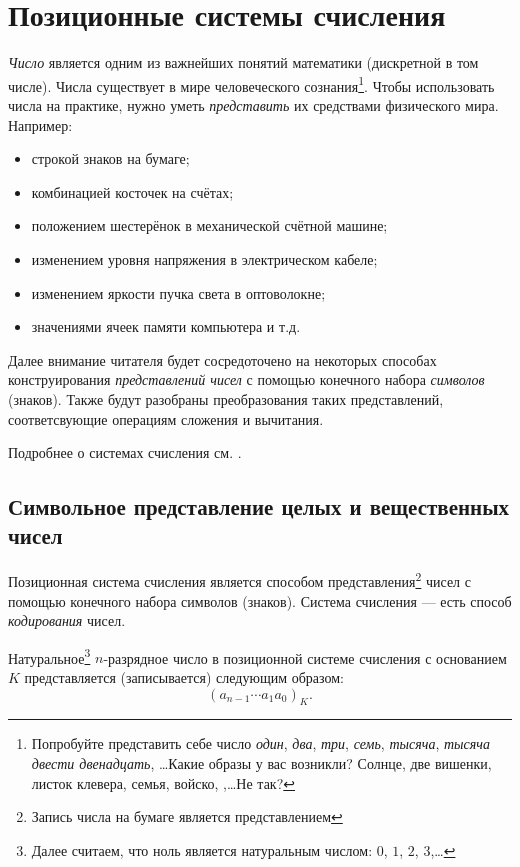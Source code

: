 \chapter{Позиционные системы счисления}
\label{ch:ss}

\emph{Число} является одним из важнейших понятий математики (дискретной в том числе). Числа существует в мире человеческого сознания\footnote{Попробуйте представить себе число \emph{один}, \emph{два}, \emph{три}, \emph{семь}, \emph{тысяча}, \emph{тысяча двести двенадцать}, \ldots Какие образы у вас возникли? Солнце, две вишенки, листок клевера, семья, войско, ,\ldots Не так?}. Чтобы использовать числа на практике, нужно уметь \emph{представить} их средствами физического мира. Например:
\begin{itemize}
    \item строкой знаков на бумаге;
    \item комбинацией косточек на счётах;
    \item положением шестерёнок в механической счётной машине;
    \item изменением уровня напряжения в электрическом кабеле;
    \item изменением яркости пучка света в оптоволокне;
    \item значениями ячеек памяти компьютера и т.д.
\end{itemize}

Далее внимание читателя будет сосредоточено на некоторых способах конструирования \emph{представлений чисел} с помощью конечного набора \emph{символов} (знаков). Также будут разобраны преобразования таких представлений, соответсвующие операциям сложения и вычитания.

Подробнее о системах счисления см. \cite{bib:gorbatov:fodm,bib:sudoplatov:discrmath}.


\section{Символьное представление целых и вещественных чисел}

Позиционная система счисления является способом представления\footnote{Запись числа на бумаге является представлением} чисел с помощью конечного набора символов (знаков). Система счисления --- есть способ \emph{кодирования} чисел.

Натуральное\footnote{Далее считаем, что ноль является натуральным числом: $0$, $1$, $2$, $3$,\ldots} $n$-разрядное число в позиционной системе счисления с основанием $K$ представляется (записывается) следующим образом:
\begin{equation}\label{eq:ch:ss:digitsN}
    (a_{n-1}\cdots a_{1}a_{0})_K.
\end{equation}

